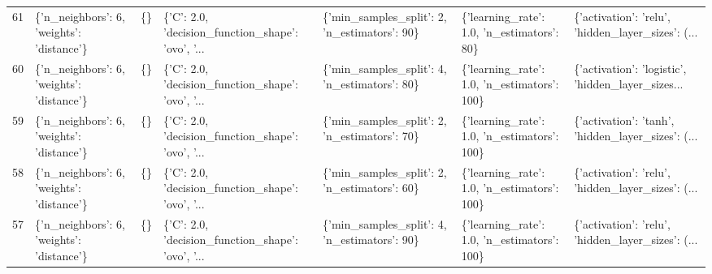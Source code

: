 \begin{tabular}{lllllll}
61  &  \{'n\_neighbors': 6, 'weights': 'distance'\} &  \{\} &  \{'C': 2.0, 'decision\_function\_shape': 'ovo', '... &   \{'min\_samples\_split': 2, 'n\_estimators': 90\} &   \{'learning\_rate': 1.0, 'n\_estimators': 80\} &  \{'activation': 'relu', 'hidden\_layer\_sizes': (... \\
60  &  \{'n\_neighbors': 6, 'weights': 'distance'\} &  \{\} &  \{'C': 2.0, 'decision\_function\_shape': 'ovo', '... &   \{'min\_samples\_split': 4, 'n\_estimators': 80\} &  \{'learning\_rate': 1.0, 'n\_estimators': 100\} &  \{'activation': 'logistic', 'hidden\_layer\_sizes... \\
59  &  \{'n\_neighbors': 6, 'weights': 'distance'\} &  \{\} &  \{'C': 2.0, 'decision\_function\_shape': 'ovo', '... &   \{'min\_samples\_split': 2, 'n\_estimators': 70\} &  \{'learning\_rate': 1.0, 'n\_estimators': 100\} &  \{'activation': 'tanh', 'hidden\_layer\_sizes': (... \\
58  &  \{'n\_neighbors': 6, 'weights': 'distance'\} &  \{\} &  \{'C': 2.0, 'decision\_function\_shape': 'ovo', '... &   \{'min\_samples\_split': 2, 'n\_estimators': 60\} &  \{'learning\_rate': 1.0, 'n\_estimators': 100\} &  \{'activation': 'relu', 'hidden\_layer\_sizes': (... \\
57  &  \{'n\_neighbors': 6, 'weights': 'distance'\} &  \{\} &  \{'C': 2.0, 'decision\_function\_shape': 'ovo', '... &   \{'min\_samples\_split': 4, 'n\_estimators': 90\} &  \{'learning\_rate': 1.0, 'n\_estimators': 100\} &  \{'activation': 'relu', 'hidden\_layer\_sizes': (... \\
\bottomrule
\end{tabular}
